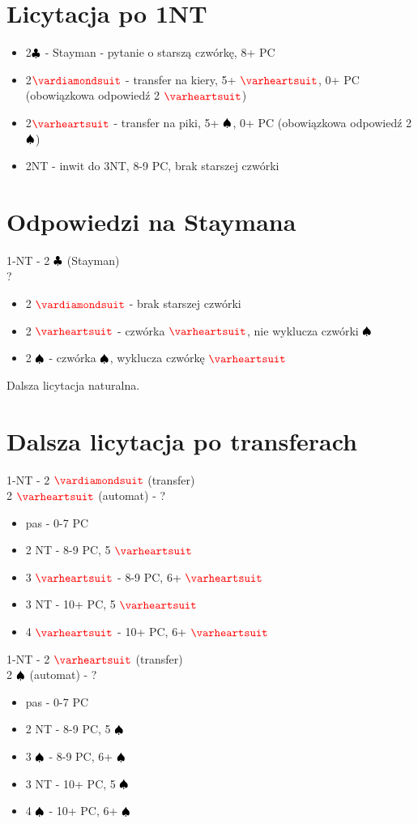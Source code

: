 \documentclass{article}
\newcommand*\Hs[1]{\ensuremath{\color{red}\varheartsuit}}
\newcommand*\Ss[1]{\ensuremath{\color{black}\spadesuit}}
\newcommand*\Ds[1]{\ensuremath{\color{red}\vardiamondsuit}}
\newcommand*\Cs[1]{\ensuremath{\color{black}\clubsuit}}
\begin{document}
    \section{Licytacja po 1NT}
    \begin{itemize}
    \item 2\Cs{} - Stayman - pytanie o starszą czwórkę, 8+ PC
    \item 2\Ds{} - transfer na kiery, 5+ \Hs{}, 0+ PC (obowiązkowa odpowiedź 2 \Hs{})
    \item 2\Hs{} - transfer na piki, 5+ \Ss{}, 0+ PC (obowiązkowa odpowiedź 2 \Ss{})
    \item 2NT - inwit do 3NT, 8-9 PC, brak starszej czwórki
    \end{itemize}
    \section{Odpowiedzi na Staymana}
    \begin{center}
    1-NT - 2 \Cs{} (Stayman) \\
   	?
    \end{center}
    \begin{itemize}
    \item 2 \Ds{} - brak starszej czwórki
    \item 2 \Hs{} - czwórka \Hs{}, nie wyklucza czwórki \Ss{}
    \item 2 \Ss{} - czwórka \Ss{}, wyklucza czwórkę \Hs{}
    \end{itemize}
    Dalsza licytacja naturalna.
    \section{Dalsza licytacja po transferach}
    \begin{center}
    1-NT - 2 \Ds{} (transfer) \\
    2 \Hs{} (automat) - ?
    \end{center}
    \begin{itemize}
    \item pas - 0-7 PC
    \item 2 NT - 8-9 PC, 5 \Hs{}
    \item 3 \Hs{} - 8-9 PC, 6+ \Hs{}
    \item 3 NT - 10+ PC, 5 \Hs{}
    \item 4 \Hs{} - 10+ PC, 6+ \Hs{}
    \end{itemize}
    \begin{center}
    1-NT - 2 \Hs{} (transfer) \\
    2 \Ss{} (automat) - ?
    \end{center}
    \begin{itemize}
    \item pas - 0-7 PC
    \item 2 NT - 8-9 PC, 5 \Ss{}
    \item 3 \Ss{} - 8-9 PC, 6+ \Ss{}
    \item 3 NT - 10+ PC, 5 \Ss{}
    \item 4 \Ss{} - 10+ PC, 6+ \Ss{}
    \end{itemize}
\end{document}
